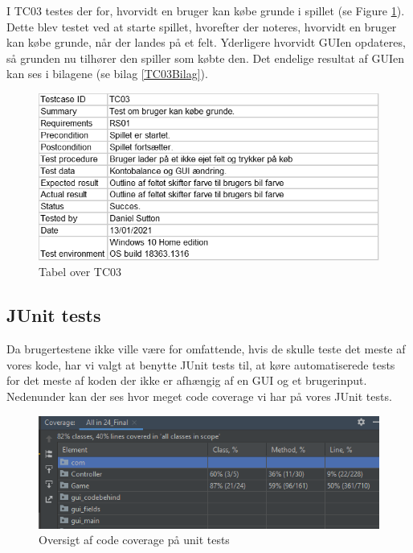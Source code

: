 \begin{flushleft}
I TC03  testes der for, hvorvidt en bruger kan købe grunde i spillet (se Figure \ref{Testcase03}). Dette blev testet ved at starte spillet, hvorefter der noteres, hvorvidt en bruger kan købe grunde, når der landes på et felt. Yderligere hvorvidt GUIen opdateres, så grunden nu tilhører den spiller som købte den. Det endelige resultat af GUIen kan ses i bilagene (se bilag \ref{TC03Bilag}).

\begin{figure}[H] %
    \centering
    \includegraphics[width=14cm]{Report/figures/Usertests/TC03.png}
    \caption{Tabel over TC03}
    \label{Testcase03}
\end{figure}

\newpage
\subsection{JUnit tests}

Da brugertestene ikke ville være for omfattende, hvis de skulle teste det meste af vores kode, har vi valgt at benytte JUnit tests til, at køre automatiserede tests for det meste af koden der ikke er afhængig af en GUI og et brugerinput.
Nedenunder kan der ses hvor meget code coverage vi har på vores JUnit tests.

\begin{figure}[H] %
    \centering
    \includegraphics[width=14cm]{Report/figures/Unittests/testcodecoverage.PNG}
    \caption{Oversigt af code coverage på unit tests}
    \label{Testcodecoverage}
\end{figure}


\end{flushleft}
